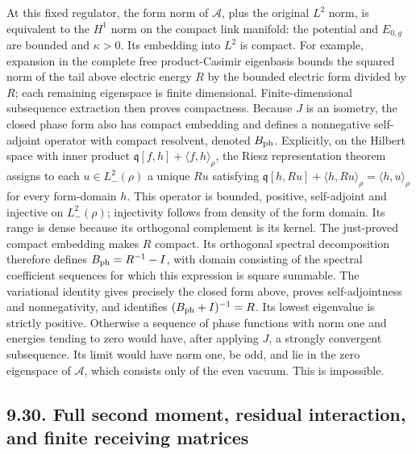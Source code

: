 \documentclass[11pt]{article}
\begin{document}
At this fixed regulator, the form norm of \(\mathcal A\), plus
the original \(L^2\) norm, is equivalent to the \(H^1\) norm on
the compact link manifold: the potential and \(E_{0,g}\) are bounded
and \(\kappa>0\). Its embedding into \(L^2\) is compact. For example,
expansion in the complete free product-Casimir eigenbasis bounds
the squared norm of the tail above electric energy \(R\) by the
bounded electric form divided by \(R\); each remaining eigenspace
is finite dimensional. Finite-dimensional subsequence extraction
then proves compactness. Because \(J\) is an isometry, the closed
phase form also has compact embedding and defines a nonnegative
self-adjoint operator with compact resolvent, denoted \(B_{\rm ph}\).
Explicitly, on the Hilbert space with inner product
\(\mathfrak q[f,h]+\langle f,h\rangle_\rho\), the Riesz
representation theorem assigns to each \(u\in L^2_-(\rho)\)
a unique \(Ru\) satisfying
\(\mathfrak q[h,Ru]+\langle h,Ru\rangle_\rho=\langle h,u\rangle_\rho\)
for every form-domain \(h\). This operator is bounded, positive,
self-adjoint and injective on \(L^2_-(\rho)\); injectivity follows
from density of the form domain. Its range is dense because its
orthogonal complement is its kernel. The just-proved compact
embedding makes \(R\) compact. Its orthogonal spectral decomposition
therefore defines \(B_{\rm ph}=R^{-1}-I\), with domain consisting
of the spectral coefficient sequences for which this expression
is square summable. The variational identity gives precisely the
closed form above, proves self-adjointness and nonnegativity, and
identifies \((B_{\rm ph}+I)^{-1}=R\).
Its lowest eigenvalue is strictly positive. Otherwise a sequence
of phase functions with norm one and energies tending to zero
would have, after applying \(J\), a strongly convergent subsequence.
Its limit would have norm one, be odd, and lie in the zero
eigenspace of \(\mathcal A\), which consists only of the even
vacuum. This is impossible.

\subsection*{9.30. Full second moment, residual interaction, and finite receiving matrices}
\end{document}
